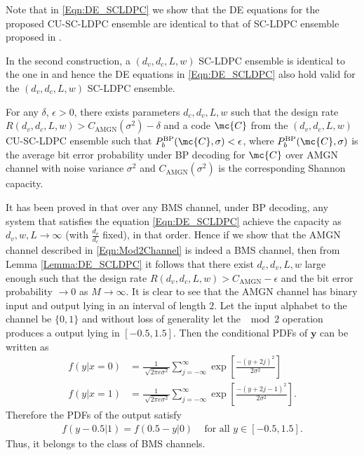 \documentclass[journal]{IEEEtran}
\begin{document}
Note that in \eqref{Eqn:DE_SCLDPC} we show that the DE equations for the proposed CU-SC-LDPC ensemble are identical to that of SC-LDPC ensemble proposed in \cite{KudekarUrbanke11,kudekaruniversal}.
\begin{Remark}\label{Rmk:Same_DE}
In the second construction, a $(d_{v},d_{c},L,w)$ SC-LDPC ensemble is identical to the one in \cite{kudekaruniversal} and hence the DE equations in \eqref{Eqn:DE_SCLDPC} also hold valid for the $(d_{v},d_{c},L,w)$ SC-LDPC ensemble.
\end{Remark}

\begin{lemma}\label{Lemma:BMSProof1}
For any $\delta$, $\epsilon>0$, there exists parameters $d_{c},d_{v},L,w$ such that the design rate $R(d_{v},d_{c},L,w)>C_{\text{AMGN}}(\sigma^{2})-\delta$ and a code $\mc{C}$ from the  $(d_{v},d_{c},L,w)$ CU-SC-LDPC  ensemble such that $P_{b}^{\text{BP}}(\mc{C},\sigma)< \epsilon$, where $P_{b}^{\text{BP}}(\mc{C},\sigma)$ is the average bit error probability under BP decoding for $\mc{C}$ over AMGN channel with noise variance $\sigma^{2}$ and $C_{\text{AMGN}}(\sigma^{2})$ is the corresponding Shannon capacity.
\end{lemma}
\begin{IEEEproof}
It has been proved in \cite{kudekaruniversal,kumar2012proof} that over any BMS channel, under BP decoding, any system that satisfies the equation \eqref{Eqn:DE_SCLDPC} achieve the capacity as $d_{v},w,L \rightarrow \infty$ (with $\frac{d_{v}}{d_{c}}$ fixed), in that order. Hence if we show that the AMGN channel described in \eqref{Eqn:Mod2Channel} is indeed a BMS channel, then from Lemma \ref{Lemma:DE_SCLDPC} it follows that there exist $d_{c},d_{v},L,w$ large enough such that the design rate $R(d_{v},d_{c},L,w)>C_{\text{AMGN}}-\epsilon$ and the bit error probability $\rightarrow 0$  as $M\rightarrow \infty$. It is clear to see that the AMGN channel has binary input and output lying in an interval of length $2$. Let the input alphabet to the channel be $\{0,1\}$ and without loss of generality let the $\mod 2$ operation produces a output lying in $[-0.5,  1.5]$. Then the conditional PDFs of $\mathbf{y}$ can be written as
\begin{align}
f(y|x=0)&=\frac{1}{\sqrt[]{2\pi e\sigma^{2}}}\sum_{j=-\infty}^{\infty}\exp\left[\frac{ -(y+2j)^{2}}{2\sigma^{2}}\right]\\
f(y|x=1)&=\frac{1}{\sqrt[]{2\pi e\sigma^{2}}}\sum_{j=-\infty}^{\infty}\exp\left[\frac{ -(y+2j-1)^{2}}{2\sigma^{2}}\right].
\end{align}
Therefore the PDFs of the output satisfy
\begin{align*}
f(y-0.5|1)=f(0.5-y|0) \hspace{10pt} \text{ for all } y\in [-0.5, 1.5].
\end{align*}
Thus, it belongs to the class of BMS channels.
\end{IEEEproof}
\end{document}
